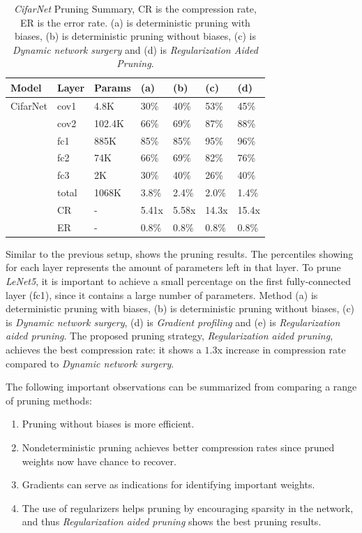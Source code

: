 \documentclass[a4paper,12pt]{report}
\begin{document}
\begin{table}[!h]
  \centering
  \begin{tabular}{lllllll}
    \hline
    Model   &Layer     &Params    &(a)  &(b)    &(c) &(d)  \\
    \hline
    CifarNet  &cov1     &4.8K       &30\%   &40\%   &53\% &45\%\\
            &cov2     &102.4K     &66\%   &69\%   &87\% &88\%\\
            &fc1      &885K       &85\%   &85\%   &95\% &96\%\\
            &fc2      &74K        &66\%   &69\%   &82\% &76\%\\
            &fc3      &2K         &30\%   &40\%   &26\% &40\%\\
            &total    &1068K      &3.8\%  &2.4\%  &2.0\% &1.4\%\\
    \hline

            &CR       &-          &5.41x   &5.58x  &14.3x   &15.4x\\
            &ER       &-          &0.8\%   &0.8\%  &0.8\%   &0.8\%\\
    \hline
  \end{tabular}
  \caption{\textit{CifarNet} Pruning Summary, CR is the compression
  rate, ER is the error rate. (a) is deterministic pruning with biases, (b) is
  deterministic pruning without biases, (c) is \textit{Dynamic network surgery}
  and (d) is \textit{Regularization Aided Pruning}.}
  \label{fig:cifar_prune_new_summary}
\end{table}
Similar to the previous setup,  shows the pruning
results.
The percentiles showing for each layer represents the amount of
parameters left in that layer.
To prune \textit{LeNet5}, it is important to achieve a small percentage on
the first fully-connected layer (fc1), since it contains a large number of
parameters.
Method (a) is deterministic pruning with biases, (b) is
deterministic pruning without biases, (c) is \textit{Dynamic network surgery},
(d) is \textit{Gradient profiling} and (e) is
\textit{Regularization aided pruning}.
The proposed pruning strategy, \textit{Regularization aided pruning}, achieves
the best compression rate: it shows a $1.3$x increase in compression rate compared
to \textit{Dynamic network surgery}.

The following important observations can be summarized from comparing a range
of pruning methods:
\begin{enumerate}
  \item Pruning without biases is more efficient.
  \item Nondeterministic pruning achieves better compression rates since pruned weights now have chance to recover.
  \item Gradients can serve as indications for identifying important weights.
  \item The use of regularizers helps pruning by encouraging sparsity in the network,
  and thus \textit{Regularization aided pruning} shows the best pruning results.
\end{enumerate}
\end{document}

